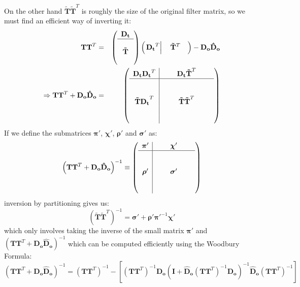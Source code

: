 \documentclass{article}
\begin{document}
On the other hand $\mathbf{\tilde{T}\tilde{T}}^T$ is roughly the size of the
original filter matrix, so we must find an efficient way of inverting it:
\begin{eqnarray*}
	\mathbf{TT}^T&=&\left(\begin{array}{c} \mathbf{D_t} \\ \hline \\
		\mathbf{\tilde{T}} \\ {} \end{array}\right)
		\left(\left.\mathbf{D_t}^T\right|
		\quad \mathbf{\tilde{T}}^T\quad\right) - \mathbf{D_o\hat{D}_o} \\
	\Rightarrow \mathbf{TT}^T+\mathbf{D_o\hat{D}_o} &=& 
	\left(\begin{array}{c|ccc} 
		\mathbf{D_tD_t}^T & {\quad} & \mathbf{D_t\tilde{T}}^T& {\quad}\\
%
		\hline\\
%
		& & & \\
%
		\mathbf{\tilde{T}D_t}^T& {\quad} & \mathbf{\tilde{T}\tilde{T}}^T & 
		{\quad} \\
		& & &\\
		& & &\\
	\end{array}\right) 
\end{eqnarray*}
If we define the submatrices $\boldsymbol{\pi}'$, $\boldsymbol{\chi}'$,
$\boldsymbol{\rho}'$ and $\boldsymbol{\sigma}'$ as:
\begin{equation}
	\left(\mathbf{TT}^T+\mathbf{D_o\hat{D}_o}\right)^{-1}\equiv
	\left(\begin{array}{c|ccc} 
		\boldsymbol{\pi}' & {\quad} & \boldsymbol{\chi}' & {\quad}\\
%
		\hline\\
%
		& & & \\
%
		\boldsymbol{\rho}' & {\quad} & \boldsymbol{\sigma}' & 
		{\quad} \\
		& & &\\
		& & &\\
	\end{array}\right) 
\end{equation}
inversion by partitioning gives us:
\begin{equation}
	\left(\mathbf{\tilde{T}\tilde{T}}^T\right)^{-1}=\boldsymbol{\sigma}'+
	\boldsymbol{\rho}'\boldsymbol{\pi}'^{-1}\boldsymbol{\chi}'
	\label{eq: TTtilde inverse}
\end{equation}
which only involves taking the inverse of the small matrix
$\boldsymbol{\pi}'$ and
$\left(\mathbf{TT}^T+\mathbf{D_o\hat{D}_o}\right)^{-1}$ which can be 
computed efficiently using the Woodbury Formula:
\begin{equation}
	\left(\mathbf{TT}^T+\mathbf{D_o\hat{D}_o}\right)^{-1}=
	\left(\mathbf{TT}^T\right)^{-1}-\left[
	\left(\mathbf{TT}^T\right)^{-1}\mathbf{D_o}\left(\mathbf{I}+
	\mathbf{\hat{D}_o}\left(\mathbf{TT}^T\right)^{-1}\mathbf{D_o}
	\right)^{-1}\mathbf{\hat{D}_o}\left(\mathbf{TT}^T\right)^{-1}\right]
\end{equation}
\end{document}
